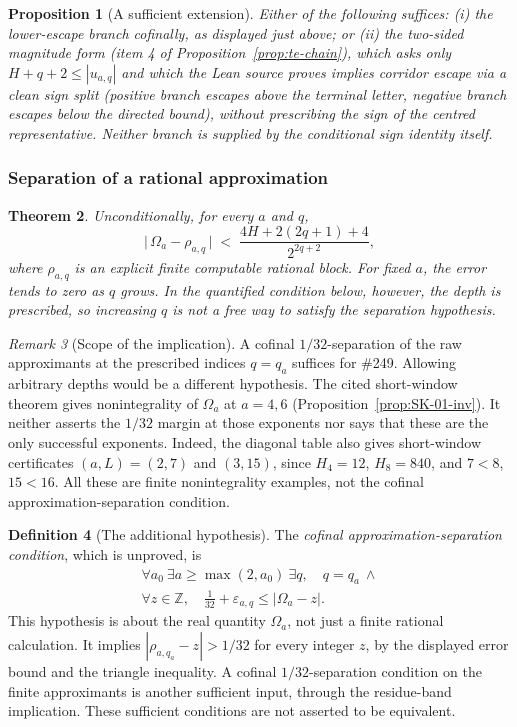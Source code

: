 \documentclass[11pt]{article}
\theoremstyle{plain}
\newtheorem{thm}{Theorem}[section]
\newtheorem{prop}[thm]{Proposition}
\theoremstyle{definition}
\newtheorem{defn}[thm]{Definition}
\theoremstyle{remark}
\newtheorem{rem}[thm]{Remark}
\begin{document}
\begin{prop}[A sufficient extension]\label{prop:sufficient-extension}
Either of the following suffices: (i) the lower-escape branch cofinally, as displayed just above; or (ii) the two-sided
magnitude form
(item 4 of Proposition~\ref{prop:te-chain}), which asks only $H{+}q{+}2 \le
|u_{a,q}|$ and which the Lean source proves
implies corridor escape via a clean sign split (positive branch escapes above the terminal letter,
negative branch escapes below the directed bound), without prescribing the sign of the centred representative. Neither
branch is supplied by the conditional sign identity itself.
\end{prop}

\subsubsection{Separation of a rational approximation}

\begin{thm}\label{thm:separation-rational-approximation}
Unconditionally, for every $a$ and $q$,
\[
  \bigl|\, \Omega_a - \rho_{a,q} \,\bigr|
  \;<\; \frac{4H + 2(2q{+}1) + 4}{2^{2q+2}} ,
\]
where $\rho_{a,q}$ is an explicit finite computable rational block. For fixed $a$, the error tends to zero as $q$ grows. In the quantified
condition below, however, the depth is prescribed, so increasing $q$
is not a free way to satisfy the separation hypothesis.
\end{thm}

\begin{rem}[Scope of the implication]
A cofinal $1/32$-separation of the raw approximants at the prescribed
indices $q=q_a$ suffices for \#249. Allowing arbitrary depths would be a
different hypothesis. The cited short-window theorem gives
nonintegrality of $\Omega_a$ at $a=4,6$
(Proposition~\ref{prop:SK-01-inv}).
It neither asserts the $1/32$ margin at those exponents nor says that
these are the only successful exponents. Indeed, the diagonal table also
gives short-window certificates $(a,L)=(2,7)$ and $(3,15)$, since
$H_4=12$, $H_8=840$, and $7<8$, $15<16$. All these are finite
nonintegrality examples, not the cofinal approximation-separation condition.
\end{rem}

\begin{defn}[The additional hypothesis]
The \emph{cofinal approximation-separation condition}, which is unproved, is
\[
 \begin{gathered}
  \forall a_0\ \exists a\ge\max(2,a_0)\ \exists q,\quad q=q_a\ \wedge\\
  \forall z\in\mathbb Z,\quad \tfrac1{32}+\varepsilon_{a,q}
       \le |\Omega_a-z| .
 \end{gathered}
\]
This hypothesis is about the real quantity $\Omega_a$, not just a finite
rational calculation. It implies
$|\rho_{a,q_a}-z|>1/32$ for every integer $z$, by the displayed error
bound and the triangle inequality. A cofinal $1/32$-separation condition
on the finite approximants is another sufficient input, through the
residue-band implication. These sufficient conditions are not asserted
to be equivalent.
\end{defn}
\end{document}
